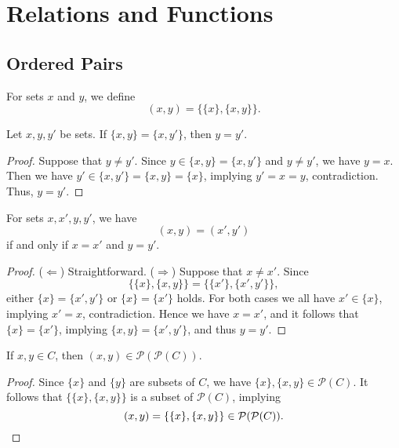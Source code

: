 \chapter{Relations and Functions}
\section{Ordered Pairs}
\begin{definition}
  For sets $x$ and $y$, we define
  \begin{equation*}
    (x, y) = \{\{x\}, \{x, y\}\}.
  \end{equation*}
\end{definition}

\begin{lemma}
  Let $x, y, y'$ be sets.
  If $\{x, y\} = \{x, y'\}$, then $y = y'$.
\end{lemma}
\begin{proof}
  Suppose that $y \neq y'$.
  Since $y \in \{x, y\} = \{x, y'\}$ and $y \neq y'$, we have $y = x$.
  Then we have $y' \in \{x, y'\} = \{x, y\} = \{x\}$, implying $y' = x = y$,
  contradiction.
  Thus, $y = y'$.
\end{proof}

\begin{theorem}
  For sets $x, x', y, y'$, we have
  \begin{equation*}
    (x, y) = (x', y')
  \end{equation*}
  if and only if $x = x'$ and $y = y'$.
\end{theorem}
\begin{proof}
  ($\Leftarrow$)
  Straightforward.
  ($\Rightarrow$)
  Suppose that $x \neq x'$.
  Since
  \begin{equation*}
    \{\{x\}, \{x, y\}\} = \{\{x'\}, \{x', y'\}\},
  \end{equation*}
  either $\{x\} = \{x', y'\}$ or $\{x\} = \{x'\}$ holds.
  For both cases we all have $x' \in \{x\}$, implying $x' = x$, contradiction.
  Hence we have $x = x'$, and it follows that $\{x\} = \{x'\}$, implying
  $\{x, y\} = \{x', y'\}$, and thus $y = y'$.
\end{proof}

\begin{lemma}
  If $x, y \in C$, then $(x, y) \in \mathcal{P}(\mathcal{P}(C))$.
\end{lemma}
\begin{proof}
  Since $\{x\}$ and $\{y\}$ are subsets of $C$, we have
  $\{x\}, \{x, y\} \in \mathcal{P}(C)$.
  It follows that $\{\{x\}, \{x, y\}\}$ is a subset of $\mathcal{P}(C)$,
  implying
  \begin{equation*}
    (x, y) = \{\{x\}, \{x, y\}\} \in \mathcal{P}(\mathcal{P}(C)).
    \qedhere
  \end{equation*}
\end{proof}

